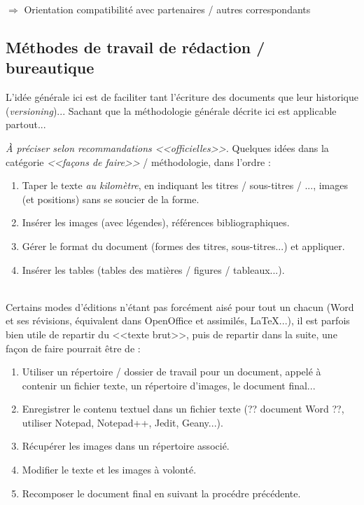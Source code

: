 \documentclass[11pt,twoside,a4paper]{article}
\begin{document}
	$\Rightarrow$ Orientation compatibilit{\'e} avec partenaires / autres correspondants

\clearpage

\subsection{M{\'e}thodes de travail de r{\'e}daction / bureautique}

L'id{\'e}e g{\'e}n{\'e}rale ici est de faciliter tant l'{\'e}criture des documents que leur historique (\emph{versioning})... Sachant que la m{\'e}thodologie g{\'e}n{\'e}rale d{\'e}crite ici est applicable partout...

\emph{{\`A} pr{\'e}ciser selon recommandations <<officielles>>. }Quelques id{\'e}es dans la cat{\'e}gorie \emph{<<fa\c{c}ons de faire>>} / m{\'e}thodologie, dans l'ordre :
\begin{enumerate}
	\item Taper le texte \textit{au kilom{\`e}tre}, en indiquant les titres / sous-titres / ..., images (et positions) sans se soucier de la forme. 
	\item Ins{\'e}rer les images (avec l{\'e}gendes), r{\'e}f{\'e}rences bibliographiques. 
	\item G{\'e}rer le format du document (formes des titres, sous-titres...) et appliquer. 
	\item Ins{\'e}rer les tables (tables des mati{\`e}res / figures / tableaux...). 
\end{enumerate}~\\

Certains modes d'{\'e}ditions n'{\'e}tant pas forc{\'e}ment ais{\'e} pour tout un chacun (Word et ses r{\'e}visions, {\'e}quivalent dans OpenOffice et assimil{\'e}s, \LaTeX...), il est parfois bien utile de repartir du <<texte brut>>, puis de repartir dans la suite, une fa\c{c}on de faire pourrait {\^e}tre de : 
\begin{enumerate}
	\item Utiliser un r{\'e}pertoire / dossier de travail pour un document, appel{\'e} {\`a} contenir un fichier texte, un r{\'e}pertoire d'images, le document final...
	\item Enregistrer le contenu textuel dans un fichier texte (?? document Word ??, utiliser Notepad, Notepad++, Jedit, Geany...). 
	\item R{\'e}cup{\'e}rer les images dans un r{\'e}pertoire associ{\'e}. 
	\item Modifier le texte et les images {\`a} volont{\'e}. 
	\item Recomposer le document final en suivant la proc{\'e}dre pr{\'e}c{\'e}dente. 
\end{enumerate}~\\
\end{document}
